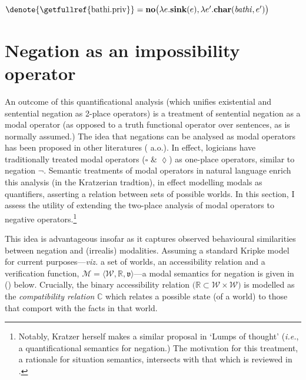 	$ \denote{\textup{\getfullref{bathi.priv}}}=\textbf{no}\big(\lambda e.\textbf{sink}(e),\lambda e'.\textbf{char}(\mathit{bathi},e')\big) $
	
	\xe{}

\section{Negation as an impossibility operator}

An outcome of this quantificational analysis (which unifies existential and sentential negation as 2-place operators) is a treatment of sentential negation as a modal operator (as opposed to a truth functional operator over sentences, as is normally assumed.) The idea that negations can be analysed as modal operators has been proposed in other literatures (\citealp[see, \textit{e.g.},][]{Wansing2001,Restall1999,Horn2017,Dosen1986,Dunn1993} a.o.). In effect, logicians have traditionally treated modal operators ($ \square $ \& $\lozenge $) as one-place operators, similar to negation $ \boldsymbol\neg $. Semantic treatments of modal operators in natural language enrich this analysis (in the Kratzerian tradtion), in effect modelling modals as quantifiers, asserting a relation between sets of possible worlds. In this section, I assess the utility of extending the two-place analysis of modal operators to negative operators.\footnote{Notably, Kratzer herself makes a similar proposal in `Lumps of thought' \citeyearpar[\S~6]{Kratzer1989} (\textit{i.e.}, a quantificational semantics for negation.) The motivation for this treatment, a rationale for situation semantics, intersects with that which is reviewed in \citet[60\textit{ff}]{Restall1999}.}




 This idea is advantageous insofar as it captures observed behavioural similarities between negation and (irrealis) modalities. Assuming a standard Kripke model for current purposes---\textit{viz.} a set of worlds, an accessibility relation and a verification function, $ \mathcal M=\langle\mathcal{W\!},\mathbb{R,}\mathfrak{v} \rangle $---a modal semantics for negation is given in (\nextx) below. Crucially, the binary accessibility relation $ \big(\mathbb R\subset\mathcal W\times\mathcal W\big) $ is modelled as the \textit{compatibility relation} $ \mathbb{C}  $ which relates a possible state (of a world) to those that comport with the facts in that world.
 

